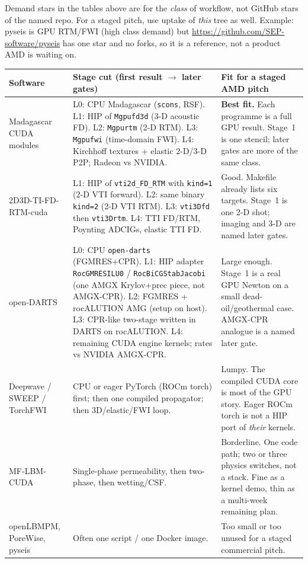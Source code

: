 \documentclass[11pt,a4paper]{article}
\begin{document}
Demand stars in the tables above are for the \emph{class} of workflow, not GitHub stars
of the named repo. For a staged pitch, use uptake of \emph{this} tree as well.
Example: pyseis is GPU RTM/FWI (high class demand) but
\url{https://github.com/SEP-software/pyseis} has one star and no forks,
so it is a reference, not a product AMD is waiting on.

\begin{longtable}{@{}p{}p{}p{}@{}}
\toprule
Software & Stage cut (first result $\to$ later gates) & Fit for a staged AMD pitch \\
\midrule
\endhead
Madagascar CUDA modules &
L0: CPU Madagascar (\texttt{scons}, RSF).
L1: HIP of \texttt{Mgpufd3d} (3-D acoustic FD).
L2: \texttt{Mgpurtm} (2-D RTM).
L3: \texttt{Mgpufwi} (time-domain FWI).
L4: Kirchhoff textures + elastic 2-D/3-D P2P; Radeon vs NVIDIA. &
\textbf{Best fit.}
Each programme is a full GPU result.
Stage~1 is one stencil; later gates are more of the same class. \\
2D3D-TI-FD-RTM-cuda &
L1: HIP of \texttt{vti2d\_FD\_RTM} with \texttt{kind=1} (2-D VTI forward).
L2: same binary \texttt{kind=2} (2-D VTI RTM).
L3: \texttt{vti3Dfd} then \texttt{vti3Drtm}.
L4: TTI FD/RTM, Poynting ADCIGs, elastic TTI FD. &
Good.
Makefile already lists six targets.
Stage~1 is one 2-D shot; imaging and 3-D are named later gates. \\
open-DARTS &
L0: CPU \texttt{open-darts} (FGMRES+CPR).
L1: HIP adapter \texttt{RocGMRESILU0} / \texttt{RocBiCGStabJacobi}
(one AMGX Krylov+prec piece, not AMGX-CPR).
L2: FGMRES + rocALUTION AMG (setup on host).
L3: CPR-like two-stage written in DARTS on rocALUTION.
L4: remaining CUDA engine kernels; rates vs NVIDIA AMGX-CPR. &
Large enough.
Stage~1 is a real GPU Newton on a small dead-oil/geothermal case.
AMGX-CPR analogue is a named later gate. \\
Deepwave / SWEEP / TorchFWI &
CPU or eager PyTorch (ROCm torch) first;
then one compiled propagator;
then 3D/elastic/FWI loop. &
Lumpy.
The compiled CUDA core is most of the GPU story.
Eager ROCm torch is not a HIP port of \emph{their} kernels. \\
MF-LBM-CUDA &
Single-phase permeability, then two-phase, then wetting/CSF. &
Borderline.
One code path; two or three physics switches, not a stack.
Fine as a kernel demo, thin as a multi-week remaining plan. \\
openLBMPM, PoreWise, pyseis &
Often one script / one Docker image. &
Too small or too unused for a staged commercial pitch. \\
\bottomrule
\end{longtable}
\end{document}
